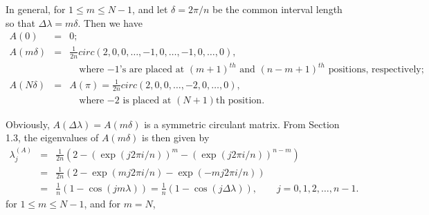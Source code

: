 
In general, for $1 \le m \le N-1$, and let $\delta = 2\pi/n$ be the common interval length so that $\Delta \lambda = m\delta$. Then we have
\begin{eqnarray*}
A(0) &=& 0; \\
A(m\delta) &=& \frac{1}{2n}circ(2, 0, 0, \ldots, -1, 0, \ldots, -1, 0, \ldots, 0), \\
& & \quad \mbox{where $-1$'s are placed at $(m+1)^{th}$ and $(n-m+1)^{th}$ positions, respectively;} \\
A(N\delta) &=& A(\pi) = \frac{1}{2n}circ(2, 0, 0, \ldots, -2, 0, \ldots, 0),\\
& & \quad \mbox{where $-2$ is placed at $(N+1)$th position.}
\end{eqnarray*}

Obviously, $A(\Delta \lambda) = A(m\delta)$ is a symmetric circulant matrix. From Section 1.3, the eigenvalues of $A(m \delta)$ is then given by
\begin{eqnarray*}
\lambda_j^{(A)} &=& \frac{1}{2n}(2 - (\exp(j2\pi i/n))^m - (\exp(j2\pi i/n))^{n-m}) \\
&=& \frac{1}{2n}(2 - \exp(mj2\pi i/n) - \exp(-mj2\pi i/n)) \\
&=& \frac{1}{n}(1 - \cos(jm\lambda)) = \frac{1}{n}(1 - \cos(j\Delta \lambda)), \quad \quad j = 0, 1, 2, \ldots, n-1.
\end{eqnarray*}
for $1 \le m \le N-1$, and for $m = N$,

